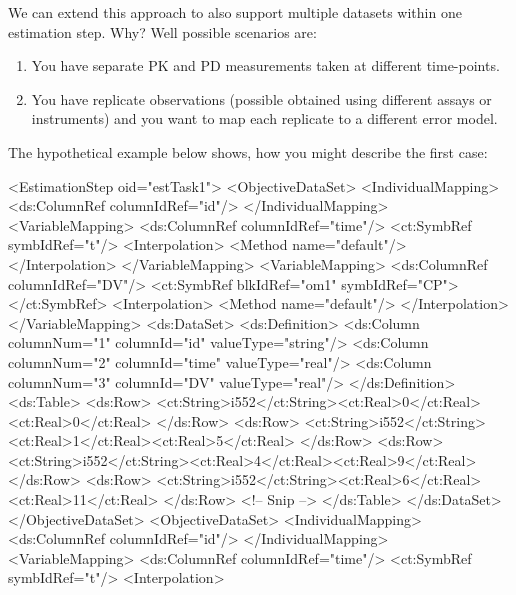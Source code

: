 \documentclass[a4paper,10pt]{article}
\newcommand{\watchout}{\marginpar{\hspace*{34pt}\raisebox{-0.5ex}{\Large\ding{43}}}}
\begin{document}
\watchout We can extend this approach to also support multiple datasets within
one estimation step. Why? Well possible scenarios are:
\begin{enumerate}
\item You have separate PK and PD measurements taken at different
  time-points.
\item You have replicate observations (possible obtained using
  different assays or instruments) and you want to map each replicate
  to a different error model.
\end{enumerate}
The hypothetical example below shows, how you might describe the first
case:
\begin{xmlcode}
<EstimationStep oid="estTask1">
    <ObjectiveDataSet>
        <IndividualMapping>
            <ds:ColumnRef  columnIdRef="id"/>
        </IndividualMapping>
        <VariableMapping>
            <ds:ColumnRef  columnIdRef="time"/>
            <ct:SymbRef symbIdRef="t"/>
            <Interpolation>
                <Method name="default"/>
            </Interpolation>
        </VariableMapping>
        <VariableMapping>
            <ds:ColumnRef  columnIdRef="DV"/>
            <ct:SymbRef blkIdRef="om1" symbIdRef="CP"></ct:SymbRef>
            <Interpolation>
                <Method name="default"/>
            </Interpolation>
        </VariableMapping>
        <ds:DataSet>
            <ds:Definition>
                <ds:Column columnNum="1" columnId="id" valueType="string"/>
                <ds:Column columnNum="2" columnId="time" valueType="real"/>
                <ds:Column columnNum="3" columnId="DV" valueType="real"/>
            </ds:Definition>
            <ds:Table>
                <ds:Row>
                    <ct:String>i552</ct:String><ct:Real>0</ct:Real><ct:Real>0</ct:Real>
                </ds:Row>
                <ds:Row>
                    <ct:String>i552</ct:String><ct:Real>1</ct:Real><ct:Real>5</ct:Real>
                </ds:Row>
                <ds:Row>
                    <ct:String>i552</ct:String><ct:Real>4</ct:Real><ct:Real>9</ct:Real>
                </ds:Row>
                <ds:Row>
                    <ct:String>i552</ct:String><ct:Real>6</ct:Real><ct:Real>11</ct:Real>
                </ds:Row>
                <!-- Snip -->
            </ds:Table>
        </ds:DataSet>
    </ObjectiveDataSet>
    <ObjectiveDataSet>
        <IndividualMapping>
            <ds:ColumnRef  columnIdRef="id"/>
        </IndividualMapping>
        <VariableMapping>
            <ds:ColumnRef  columnIdRef="time"/>
            <ct:SymbRef symbIdRef="t"/>
            <Interpolation>

\end{xmlcode}
\end{document}
